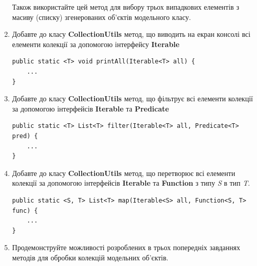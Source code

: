 \begin{enumerate}
Також використайте цей метод для вибору трьох випадкових елементів 
з масиву (списку) згенерованих об’єктів модельного класу.      
\item Добавте до класу {\bf CollectionUtils} метод, що виводить на 
екран консолі всі елементи колекції за допомогою інтерфейсу {\bf Iterable}
\begin{lstlisting}
public static <T> void printAll(Iterable<T> all) {
    ...
}
\end{lstlisting}
\item Добавте до класу {\bf CollectionUtils} метод, що фільтрує 
всі елементи колекції за допомогою інтерфейсів 
{\bf Iterable} та {\bf Predicate} 
\begin{lstlisting}
public static <T> List<T> filter(Iterable<T> all, Predicate<T> pred) {
    ...
}
\end{lstlisting}
\item Добавте до класу {\bf CollectionUtils} метод, що перетворює 
всі елементи колекції за допомогою інтерфейсів 
{\bf Iterable} та {\bf Function} з типу {\it S} в тип {\it T}. 
\begin{lstlisting}
public static <S, T> List<T> map(Iterable<S> all, Function<S, T> func) {
    ...
}
\end{lstlisting}
\item Продемонструйте можливості розроблених в трьох попередніх 
завданнях методів для обробки колекцій модельних об’єктів.  
\end{enumerate}

